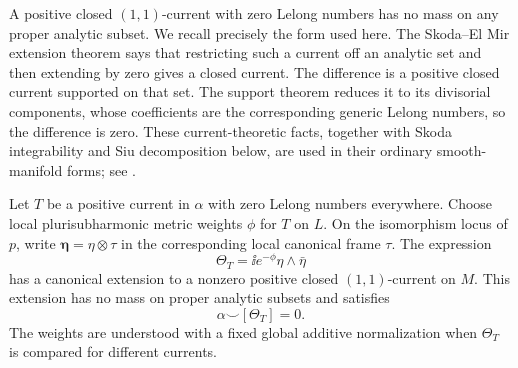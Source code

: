 A positive closed $(1,1)$-current with zero Lelong numbers has no mass
on any proper analytic subset.  We recall precisely the form used here.
The Skoda--El Mir extension theorem says that restricting such a current
off an analytic set and then extending by zero gives a closed current.
The difference is a positive closed current supported on that set.  The
support theorem reduces it to its divisorial components, whose
coefficients are the corresponding generic Lelong numbers, so the
difference is zero.  These current-theoretic facts, together with Skoda
integrability and Siu decomposition below, are used in their ordinary
smooth-manifold forms; see \cite{DemaillyComplexAnalyticGeometry}.

\begin{lemma}\label{fol:transverse-current}
Let $T$ be a positive current in $\alpha$ with zero Lelong numbers
everywhere.  Choose local plurisubharmonic metric weights $\phi$ for
$T$ on $L$.  On the isomorphism locus of $p$, write
$\boldsymbol\eta=\eta\otimes\tau$ in the corresponding local canonical
frame $\tau$.  The expression
\begin{equation}\label{fol:Theta-definition}
 \Theta_T=\ii e^{-\phi}\eta\wedge\bar\eta
\end{equation}
has a canonical extension to a nonzero positive closed $(1,1)$-current
on $M$.  This extension has no mass on proper analytic subsets and satisfies
\begin{equation}\label{fol:Theta-orthogonality}
 \alpha\smile[\Theta_T]=0.
\end{equation}
The weights are understood with a fixed global additive normalization
when $\Theta_T$ is compared for different currents.
\end{lemma}

